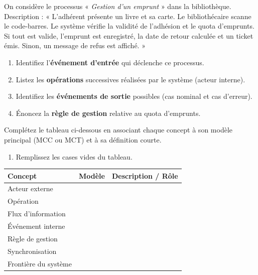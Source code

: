 \documentclass[11pt]{article}
\begin{document}
\begin{exercice}
On considère le processus « \textit{Gestion d'un emprunt} » dans la bibliothèque. Description : « L'adhérent présente un livre et sa carte. Le bibliothécaire scanne le code-barres. Le système vérifie la validité de l'adhésion et le quota d'emprunts. Si tout est valide, l'emprunt est enregistré, la date de retour calculée et un ticket émis. Sinon, un message de refus est affiché. »
\begin{enumerate}
    \item Identifiez l'\textbf{événement d'entrée} qui déclenche ce processus.
    \item Listez les \textbf{opérations} successives réalisées par le système (acteur interne).
    \item Identifiez les \textbf{événements de sortie} possibles (cas nominal et cas d'erreur).
    \item Énoncez la \textbf{règle de gestion} relative au quota d'emprunts.
\end{enumerate}
\end{exercice}

\begin{exercice}
Complétez le tableau ci-dessous en associant chaque concept à son modèle principal (MCC ou MCT) et à sa définition courte.
\begin{enumerate}
    \item Remplissez les cases vides du tableau.
\end{enumerate}

\noindent\begin{tabularx}{\linewidth}{|X|c|X|}
\hline
\textbf{Concept} & \textbf{Modèle} & \textbf{Description / Rôle} \\
\hline
Acteur externe &  &  \\
\hline
Opération &  &  \\
\hline
Flux d'information &  &  \\
\hline
Événement interne &  &  \\
\hline
Règle de gestion &  &  \\
\hline
Synchronisation &  &  \\
\hline
Frontière du système &  &  \\
\hline
\end{tabularx}
\end{exercice}
\end{document}
